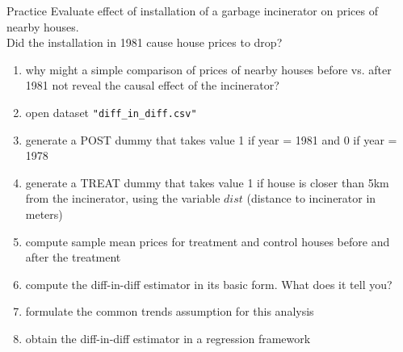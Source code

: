 \documentclass[11pt, aspectratio = 169]{beamer}
\begin{document}
\begin{frame}{Practice}
Evaluate effect of installation of a garbage incinerator on prices of nearby houses. \\
Did the installation in 1981 cause house prices to drop?
\small

\begin{enumerate}
\item why might a simple comparison of prices of nearby houses before vs. after 1981 not reveal the causal effect of the incinerator?
    \item open dataset \texttt{"diff\_in\_diff.csv"}
    \item generate a POST dummy that takes value 1 if year = 1981 and 0 if year =  1978
    \item generate a TREAT dummy that takes value 1 if house is closer than 5km from the incinerator, using the variable $dist$ (distance to incinerator in meters)
    \item compute sample mean prices for treatment and control houses before and after the treatment 
    \item  compute the diff-in-diff estimator in its basic form. What does it tell you?
    \item formulate the common trends assumption for this analysis
    \item obtain the diff-in-diff estimator in a regression framework
\end{enumerate}
    
\end{frame}
\end{document}
